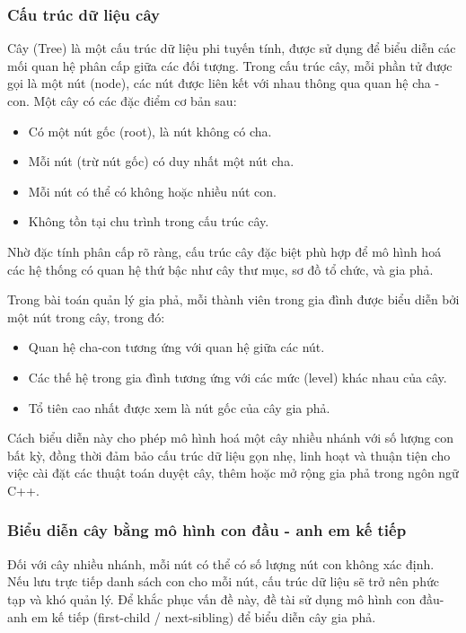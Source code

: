 \subsubsection{Cấu trúc dữ liệu cây}
Cây (Tree) là một cấu trúc dữ liệu phi tuyến tính, được sử dụng để biểu diễn các mối quan hệ phân cấp giữa các đối tượng. Trong cấu trúc cây, mỗi phần tử được gọi là một nút (node), các nút được liên kết với nhau thông qua quan hệ cha - con. Một cây có các đặc điểm cơ bản sau:
\begin{itemize}
	\item Có một nút gốc (root), là nút không có cha.
	\item Mỗi nút (trừ nút gốc) có duy nhất một nút cha.
	\item Mỗi nút có thể có không hoặc nhiều nút con.
	\item Không tồn tại chu trình trong cấu trúc cây.
\end{itemize}

Nhờ đặc tính phân cấp rõ ràng, cấu trúc cây đặc biệt phù hợp để mô hình hoá các hệ thống có quan hệ thứ bậc như cây thư mục, sơ đồ tổ chức, và gia phả.

Trong bài toán quản lý gia phả, mỗi thành viên trong gia đình được biểu diễn bởi một nút trong cây, trong đó:
\begin{itemize}
	\item Quan hệ cha-con tương ứng với quan hệ giữa các nút.
	\item Các thế hệ trong gia đình tương ứng với các mức (level) khác nhau của cây.
	\item Tổ tiên cao nhất được xem là nút gốc của cây gia phả.
\end{itemize}

Cách biểu diễn này cho phép mô hình hoá một cây nhiều nhánh với số lượng con bất kỳ, đồng thời đảm bảo cấu trúc dữ liệu gọn nhẹ, linh hoạt và thuận tiện cho việc cài đặt các thuật toán duyệt cây, thêm hoặc mở rộng gia phả trong ngôn ngữ C++.

\subsubsection{Biểu diễn cây bằng mô hình con đầu - anh em kế tiếp}

Đối với cây nhiều nhánh, mỗi nút có thể có số lượng nút con không xác định. Nếu lưu trực tiếp danh sách con cho mỗi nút, cấu trúc dữ liệu sẽ trở nên phức tạp và khó quản lý. Để khắc phục vấn đề này, đề tài sử dụng mô hình con đầu-anh em kế tiếp (first-child / next-sibling) để biểu diễn cây gia phả.

